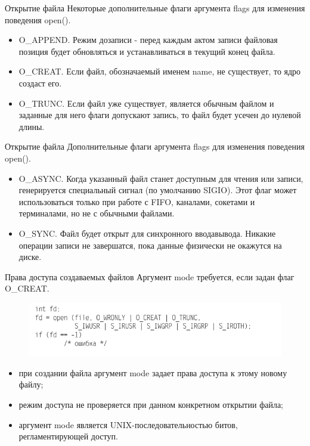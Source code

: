 \documentclass{beamer}
\begin{document}
\begin{frame}{Открытие файла}
Некоторые дополнительные флаги аргумента flags для изменения поведения open(). 
\begin{itemize}
\item O\_APPEND. Режим дозаписи - перед каждым актом записи файловая позиция будет обновляться и устанавливаться в текущий конец файла.
\item O\_CREAT. Если файл, обозначаемый именем name, не существует, то ядро создаст
его. 
\item O\_TRUNC. Если файл уже существует, является обычным файлом и заданные для
него флаги допускают запись, то файл будет усечен до нулевой длины. 
\end{itemize}
\end{frame}

\begin{frame}{Открытие файла}
Дополнительные флаги аргумента flags для изменения поведения open(). 
\begin{itemize}
\item O\_ASYNC. Когда указанный файл станет доступным для чтения или записи, генерируется специальный сигнал (по умолчанию SIGIO). Этот флаг может использоваться только при работе с FIFO, каналами, сокетами и терминалами, но не
с обычными файлами.
\item O\_SYNC. Файл будет открыт для синхронного ввода­вывода. Никакие операции
записи не завершатся, пока данные физически не окажутся на диске. 
\end{itemize}
\end{frame}

\begin{frame}{Права доступа создаваемых файлов}
Аргумент mode требуется, если задан флаг O\_CREAT. 
\begin{figure}[h]
\centering
\includegraphics[scale=0.6]{images/lec06-pic04.png}
\end{figure}
\begin{itemize}
\item при создании файла аргумент mode задает права доступа к этому новому файлу;
\item режим доступа не проверяется при данном конкретном открытии файла;
\item аргумент mode является UNIX-­последовательностью битов, регламентирующей доступ.
\end{itemize}
\end{frame}
\end{document}

